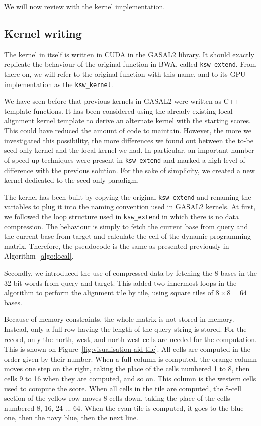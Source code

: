 We will now review with the kernel implementation.

\subsection{Kernel writing}
The kernel in itself is written in CUDA in the GASAL2 library. It should exactly replicate the behaviour of the original function in BWA, called \verb|ksw_extend|. From there on, we will refer to the original function with this name, and to its GPU implementation as the \verb|ksw_kernel|.

We have seen before that previous kernels in GASAL2 were written as C++ template functions. It has been considered using the already existing local alignment kernel template to derive an alternate kernel with the starting scores. This could have reduced the amount of code to maintain. However, the more we investigated this possibility, the more differences we found out between the to-be seed-only kernel and the local kernel we had. In particular, an important number of speed-up techniques were present in \verb|ksw_extend| and marked a high level of difference with the previous solution. For the sake of simplicity, we created a new kernel dedicated to the seed-only paradigm.

The kernel has been built by copying the original \verb|ksw_extend| and renaming the variables to plug it into the naming convention used in GASAL2 kernels. At first, we followed the loop structure used in \verb|ksw_extend| in which there is no data compression. The behaviour is simply to fetch the current base from query and the current base from target and calculate the cell of the dynamic programming matrix. Therefore, the pseudocode is the same as presented previously in Algorithm~\ref{algo:local}.

Secondly, we introduced the use of compressed data by fetching the 8 bases in the 32-bit words from query and target. This added two innermost loops in the algorithm to perform the alignment tile by tile, using square tiles of $8 \times 8 = 64$ bases.

Because of memory constraints, the whole matrix is not stored in memory. Instead, only a full row having the length of the query string is stored. For the record, only the north, west, and north-west cells are needed for the computation. This is shown on Figure~\ref{fig:visualisation-aid-tile}. All cells are computed in the order given by their number. When a full column is computed, the orange column moves one step on the right, taking the place of the cells numbered 1 to 8, then cells 9 to 16 when they are computed, and so on. This column is the western cells used to compute the score. When all cells in the tile are computed, the 8-cell section of the yellow row moves 8 cells down, taking the place of the cells numbered 8, 16, 24 ... 64. When the cyan tile is computed, it goes to the blue one, then the navy blue, then the next line.

